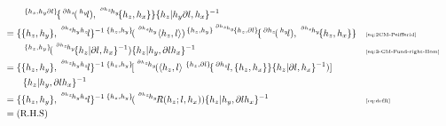 \documentclass[11pt, reqno]{amsart} %
\newcommand{\act}[1]{\,\sp{#1}\!}
\theoremstyle{definition}
\theoremstyle{remark}
\numberwithin{equation}{section}
\begin{document}
\begin{align*}
  &\qquad \act{\{h_z,h_y\partial l\}}\{\act{\partial h_z}(\act{h_y}l),\act{\act{\partial h_z}h_y}\{h_z,h_x\}\}\{h_z|h_y\partial l,h_x\}^{-1} \\
  &= \{\{h_z,h_y\},\act{\act{\partial h_z}h_yh_z}l\}^{-1}\act{\{h_z,h_y\}}(\act{\act{\partial h_z}h_y}\left<h_z,l\right>)\act{\{h_z,h_y\}\act{\act{\partial h_z}h_y}\{h_z,\partial l\}}\{\act{\partial h_z}(\act{h_y}l),\act{\act{\partial h_z}h_y}\{h_z,h_x\}\} & &\text{\tiny \eqref{eq:2CM-Peifferid}} \\
  &\qquad \act{\{h_z,h_y\}}(\act{\act{\partial h_z}h_y}\{h_z|\partial l,h_x\}^{-1})\{h_z|h_y,\partial lh_x\}^{-1} & & \text{\tiny \eqref{eq:3-CM-Fund-right-Hom}} \\
  &= \{\{h_z,h_y\},\act{\act{\partial h_z}h_yh_z}l\}^{-1}\act{\{h_z,h_y\}}[\act{\act{\partial h_z}h_y}(\left<h_z,l\right>\act{\{h_z,\partial l\}}\{\act{\partial h_z}l,\{h_z,h_x\}\}\{h_z|\partial l,h_x\}^{-1})] \\
  &\qquad \{h_z|h_y,\partial lh_x\}^{-1} \\
  &= \{\{h_z,h_y\},\act{\act{\partial h_z}h_yh_z}l\}^{-1}\act{\{h_z,h_y\}}(\act{\act{\partial h_z}h_y}R(h_z;l,h_x))\{h_z|h_y,\partial lh_x\}^{-1} & &\text{\tiny \eqref{eq:defR}} \\
  &= (\text{R.H.S})
\end{align*}
\end{document}
